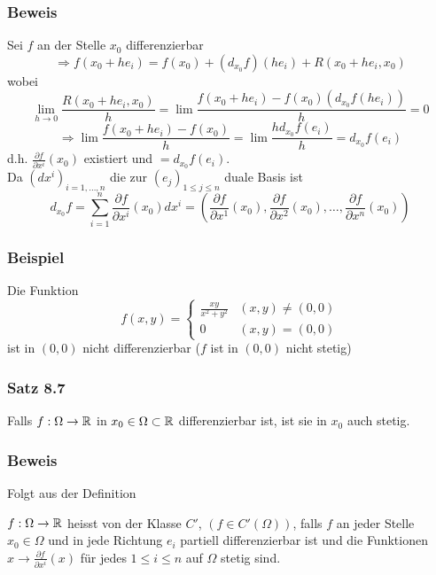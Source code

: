 \subsubsection*{Beweis}
Sei $f$ an der Stelle $x_0$ differenzierbar \[\Rightarrow f\left( {{x_0} + h{e_i}} \right) = f\left( {{x_0}} \right) + \left( {{d_{{x_0}}}f} \right)\left( {h{e_i}} \right) + R\left( {{x_0} + h{e_i},{x_0}} \right)\] wobei \[\mathop {\lim }\limits_{h \to 0} \frac{{R\left( {{x_0} + h{e_i},{x_0}} \right)}}{h} = \lim \frac{{f\left( {{x_0} + h{e_i}} \right) - f\left( {{x_0}} \right)\left( {{d_{{x_0}}}f\left( {h{e_i}} \right)} \right)}}{h} = 0\] \[ \Rightarrow \lim \frac{{f\left( {{x_0} + h{e_i}} \right) - f\left( {{x_0}} \right)}}{h} = \lim \frac{{h{d_{{x_0}}}f\left( {{e_i}} \right)}}{h} = {d_{{x_0}}}f\left( {{e_i}} \right)\] d.h. $\frac{\partial f}{\partial x^i}\left( x_0\right)$ existiert und $=d_{x_0}f\left( e_i\right)$. \\

Da $\left( dx^i\right)_{i=1,\dots,n}$ die zur $\left( e_j\right)_{1\leq j\leq n}$ duale Basis ist \[{d_{{x_0}}}f = \sum\limits_{i = 1}^n {\frac{{\partial f}}{{\partial {x^i}}}\left( {{x_0}} \right)d{x^i} = \left( {\frac{{\partial f}}{{\partial {x^1}}}\left( {{x_0}} \right),\frac{{\partial f}}{{\partial {x^2}}}\left( {{x_0}} \right), \ldots ,\frac{{\partial f}}{{\partial {x^n}}}\left( {{x_0}} \right)} \right)} \]

\subsubsection*{Beispiel}
Die Funktion \[f\left( {x,y} \right) = \left\{ {\begin{array}{*{20}{c}}
{\frac{{xy}}{{{x^2} + {y^2}}}}&{\left( {x,y} \right)\not  = \left( {0,0} \right)}\\
0&{\left( {x,y} \right) = \left( {0,0} \right)}
\end{array}} \right.\] ist in $\left( 0,0\right)$ nicht differenzierbar ($f$ ist  in $\left( 0,0\right)$ nicht stetig)

\subsubsection*{Satz 8.7}
Falls $f:\Omega\to\mathbb{R}$ in $x_0\in\Omega\subset\mathbb{R}$ differenzierbar ist, ist sie in $x_0$ auch stetig.

\subsubsection*{Beweis}
Folgt aus der Definition
\begin{definition}{8.8}
$f:\Omega\to\mathbb{R}$ heisst von der Klasse $C'$, $\left( f\in C'\left(\Omega\right)\right)$, falls $f$ an jeder Stelle $x_0\in\Omega$ und in jede Richtung $e_i$ partiell differenzierbar ist und die Funktionen $x\to\frac{\partial f}{\partial x^i}\left(x\right)$ für jedes $1\leq i\leq n$ auf $\Omega$ stetig sind.
\end{definition}
